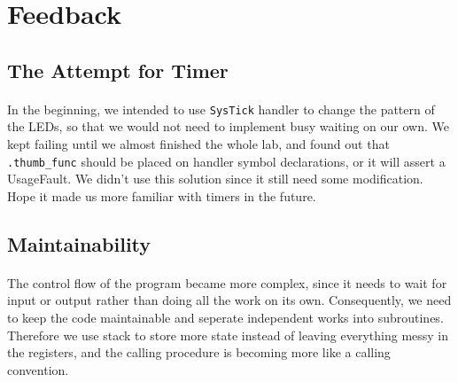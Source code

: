 \section{Feedback}
\subsection{The Attempt for Timer}
\paragraph{}
In the beginning, we intended to use \texttt{SysTick} handler to change the pattern of the LEDs,
so that we would not need to implement busy waiting on our own.
We kept failing until we almost finished the whole lab,
and found out that \texttt{.thumb\_func} should be placed on handler symbol declarations,
or it will assert a UsageFault.
We didn't use this solution since it still need some modification.
Hope it made us more familiar with timers in the future.

\subsection{Maintainability}
\paragraph{}
The control flow of the program became more complex, since it needs to wait for input or output rather than doing all the work on its own.
Consequently, we need to keep the code maintainable and seperate independent works into subroutines.
Therefore we use stack to store more state instead of leaving everything messy in the registers, 
and the calling procedure is becoming more like a calling convention.
